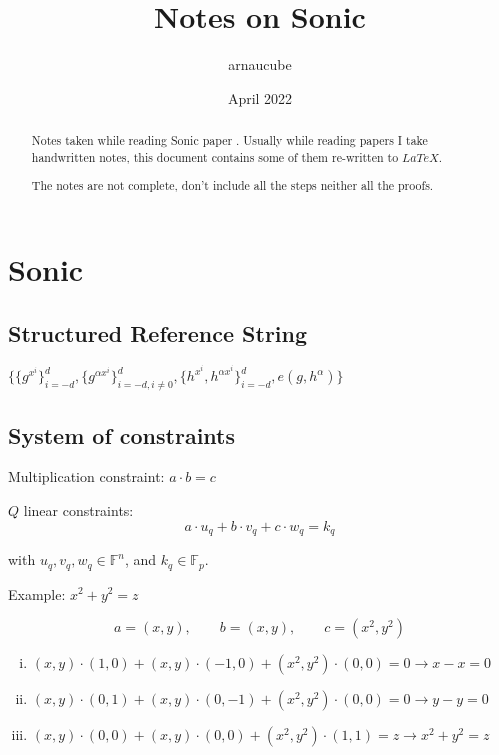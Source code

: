 \documentclass{article}
\title{Notes on Sonic}
\author{arnaucube}
\date{April 2022}
\theoremstyle{definition}
\begin{document}
\maketitle

\begin{abstract}
	Notes taken while reading Sonic paper \cite{cryptoeprint:2019/099}. Usually while reading papers I take handwritten notes, this document contains some of them re-written to $LaTeX$.

	The notes are not complete, don't include all the steps neither all the proofs.
\end{abstract}

\tableofcontents


\section{Sonic}

\subsection{Structured Reference String}
$\{ \{g^{x^i}\}_{i=-d}^d, \{ g^{\alpha x^i} \}_{i=-d, i \neq 0}^d, \{ h^{x^i}, h^{\alpha x^i} \}_{i=-d}^d, e(g, h^\alpha) \}$

\subsection{System of constraints}
Multiplication constraint: $a \cdot b = c$

$Q$ linear constraints:
$$
a \cdot u_q + b \cdot v_q + c \cdot w_q = k_q
$$

with $u_q, v_q, w_q \in \mathbb{F}^n$, and $k_q \in \mathbb{F}_p$.

\vspace{0.5cm}
Example: $x^2 + y^2 = z$

$$a = (x, y), \qquad b = (x, y), \qquad c = (x^2, y^2)$$
\begin{enumerate}[i.]
    \item $(x, y) \cdot (1, 0) + (x, y) \cdot (-1, 0) + (x^2, y^2) \cdot (0, 0) = 0 \longrightarrow x - x = 0$
    \item $(x, y) \cdot (0, 1) + (x, y) \cdot (0, -1) + (x^2, y^2) \cdot (0, 0) = 0 \longrightarrow y - y = 0$
    \item $(x, y) \cdot (0, 0) + (x, y) \cdot (0, 0) + (x^2, y^2) \cdot (1, 1) = z \longrightarrow x^2 + y^2 = z$
\end{enumerate}
\end{document}
